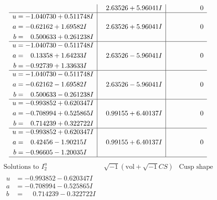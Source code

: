 \documentclass[1p]{elsarticle_modified}
\theoremstyle{definition}
\newcommand{\I}{\sqrt{-1}}
\begin{document}
$$\begin{array}{c|c|c}
 & \phantom{-}2.63526 + 5.96041 I & \phantom{-0.000000 } 0 \\ \hline\begin{aligned}
u &= -1.040730 + 0.511748 I \\
a &= -0.62162 + 1.69582 I \\
b &= \phantom{-}0.500633 + 0.261238 I\end{aligned}
 & \phantom{-}2.63526 + 5.96041 I & \phantom{-0.000000 } 0 \\ \hline\begin{aligned}
u &= -1.040730 - 0.511748 I \\
a &= \phantom{-}0.13358 + 1.64233 I \\
b &= -0.92739 + 1.33633 I\end{aligned}
 & \phantom{-}2.63526 - 5.96041 I & \phantom{-0.000000 } 0 \\ \hline\begin{aligned}
u &= -1.040730 - 0.511748 I \\
a &= -0.62162 - 1.69582 I \\
b &= \phantom{-}0.500633 - 0.261238 I\end{aligned}
 & \phantom{-}2.63526 - 5.96041 I & \phantom{-0.000000 } 0 \\ \hline\begin{aligned}
u &= -0.993852 + 0.620347 I \\
a &= -0.708994 + 0.525865 I \\
b &= \phantom{-}0.714239 + 0.322722 I\end{aligned}
 & \phantom{-}0.99155 + 6.40137 I & \phantom{-0.000000 } 0 \\ \hline\begin{aligned}
u &= -0.993852 + 0.620347 I \\
a &= \phantom{-}0.42456 - 1.90215 I \\
b &= -0.96605 - 1.20035 I\end{aligned}
 & \phantom{-}0.99155 + 6.40137 I & \phantom{-0.000000 } 0\\
 \hline 
 \end{array}$$\newpage$$\begin{array}{c|c|c}  
\text{Solutions to }I^u_{2}& \I (\text{vol} + \sqrt{-1}CS) & \text{Cusp shape}\\
 \hline 
\begin{aligned}
u &= -0.993852 - 0.620347 I \\
a &= -0.708994 - 0.525865 I \\
b &= \phantom{-}0.714239 - 0.322722 I\end{aligned}

\end{array}$$
\end{document}
